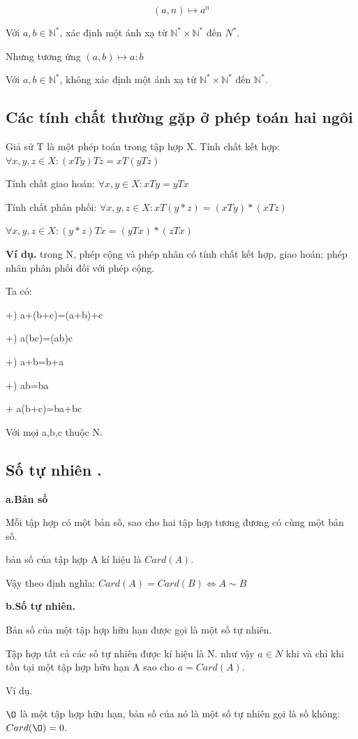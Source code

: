 \documentclass[12pt,oneside,a4paper,reqno]{book}
\begin{document}
$$(a,n)\mapsto a^n$$

Với $a,b\in  \mathbb{N}^*$, xác định một ánh xạ từ $\mathbb{N}^*\times \mathbb{N}^*$  đến $N^*$.   
   
Nhưng tương ứng $(a,b)\mapsto a:b$     

 Với $a,b \in  \mathbb{N}^*$, không xác định  một ánh xạ từ $\mathbb{N}^*\times \mathbb{N}^*$  đến $\mathbb{N}^*. $  

\subsection{Các tính chất thường gặp ở phép toán hai ngôi}
Giả sử T là một phép toán trong tập hợp X.
	Tính chất kết hợp: $\forall x,y,z\in X:(xTy)Tz=xT(yTz)$
	
	Tính chất giao hoán: $\forall x,y\in X:xTy=yTx$
	
	Tính chất phân phối: $\forall x,y,z\in X:xT(y*z)=(xTy)*(xTz)$
	
   $\forall x,y,z\in X:(y*z)Tx=(yTx)*(zTx)$   
    
\textbf{Ví dụ.} trong N, phép cộng và phép nhân có tính chất kết hợp, giao hoán; phép nhân phân phối đối với phép cộng.

Ta có:

+) a+(b+c)=(a+b)+c

+) a(bc)=(ab)c

+) a+b=b+a

+) ab=ba

+  a(b+c)=ba+bc

Với mọi a,b,c thuộc N.

\subsection{Số tự nhiên .}
\textbf{a.Bản số}

Mỗi tập hợp có một bản số, sao cho hai tập hợp tương đương có cùng một 
bản số.

bản số của tập hợp A kí hiệu là $Card(A)$. 

Vậy theo định nghĩa:
  $Card(A)=Card(B)\Leftrightarrow A\sim B$
  
\textbf{b.Số tự nhiên.}

Bản số của một tập hợp hữu hạn được gọi là một số tự nhiên.
      
Tập hợp tất cả các số tự nhiên được kí hiệu là N. như vậy $a\in N$ khi và chỉ khi tồn tại một tập hợp hữu hạn A sao cho $a=Card(A).$

Ví dụ.

$\O$ là một tập hợp hữu hạn, bản số của nó là một số tự nhiên gọi là số không: $Card(\O )=0.$
\end{document}
